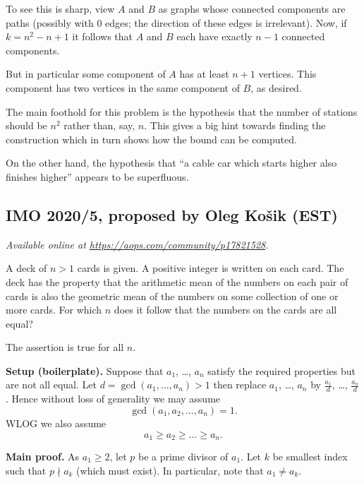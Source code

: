 \documentclass[11pt]{scrartcl}
\begin{document}
To see this is sharp, view $A$ and $B$ as graphs
whose connected components are paths (possibly with $0$ edges;
the direction of these edges is irrelevant).
Now, if $k = n^2-n+1$ it follows that $A$ and $B$
each have exactly $n-1$ connected components.

But in particular some component of $A$ has at least $n+1$ vertices.
This component has two vertices in the same component of $B$, as desired.

\begin{remark*}
  The main foothold for this problem is the hypothesis
  that the number of stations should be $n^2$ rather than, say, $n$.
  This gives a big hint towards finding the construction
  which in turn shows how the bound can be computed.

  On the other hand, the hypothesis that
  ``a cable car which starts higher
  also finishes higher'' appears to be superfluous.
\end{remark*}
\pagebreak

\subsection{IMO 2020/5, proposed by Oleg Ko\v{s}ik (EST)}
\textsl{Available online at \url{https://aops.com/community/p17821528}.}
\begin{mdframed}[style=mdpurplebox,frametitle={Problem statement}]
A deck of $n > 1$ cards is given.
A positive integer is written on each card.
The deck has the property that the arithmetic mean of the
numbers on each pair of cards is also the
geometric mean of the numbers on some collection of one or more cards.
For which $n$ does it follow that the numbers on the cards are all equal?
\end{mdframed}
The assertion is true for all $n$.

\bigskip

\textbf{Setup (boilerplate).}
Suppose that $a_1$, \dots, $a_n$ satisfy the required properties
but are not all equal.
Let $d = \gcd(a_1, \dots, a_n) > 1$
then replace $a_1$, \dots, $a_n$ by
$\frac{a_1}{d}$, \dots, $\frac{a_n}{d}$.
Hence without loss of generality we may assume
\[ \gcd(a_1, a_2, \dots, a_n) = 1. \]
WLOG we also assume \[ a_1 \ge a_2 \ge \dots \ge a_n. \]

\bigskip

\textbf{Main proof.}
As $a_1 \ge 2$, let $p$ be a prime divisor of $a_1$.
Let $k$ be smallest index such that $p \nmid a_k$ (which must exist).
In particular, note that $a_1 \neq a_k$.
\end{document}
